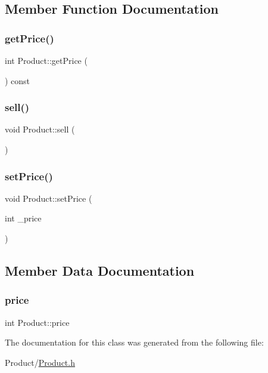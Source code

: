 \subsection{Member Function Documentation}
\mbox{\label{classProduct_a822232ae63108d7790fae0c56d3c4171}} 
\subsubsection{\texorpdfstring{getPrice()}{getPrice()}}
{\footnotesize\ttfamily int Product\+::get\+Price (\begin{DoxyParamCaption}{ }\end{DoxyParamCaption}) const}

\mbox{\label{classProduct_a8061a46acea7b7888bf553a0451910e3}} 
\subsubsection{\texorpdfstring{sell()}{sell()}}
{\footnotesize\ttfamily void Product\+::sell (\begin{DoxyParamCaption}{ }\end{DoxyParamCaption})}

\mbox{\label{classProduct_a278fb7c9e92ed41c01b5c9287ebe18e2}} 
\subsubsection{\texorpdfstring{setPrice()}{setPrice()}}
{\footnotesize\ttfamily void Product\+::set\+Price (\begin{DoxyParamCaption}\item[{int}]{\+\_\+price }\end{DoxyParamCaption})}



\subsection{Member Data Documentation}
\mbox{\label{classProduct_a06761b1d08d2b3fb032b1b9a13d90782}} 
\subsubsection{\texorpdfstring{price}{price}}
{\footnotesize\ttfamily int Product\+::price\hspace{0.3cm}{\ttfamily [protected]}}



The documentation for this class was generated from the following file\+:\begin{DoxyCompactItemize}
\item 
Product/\mbox{\hyperlink{Product_8h}{Product.\+h}}\end{DoxyCompactItemize}
